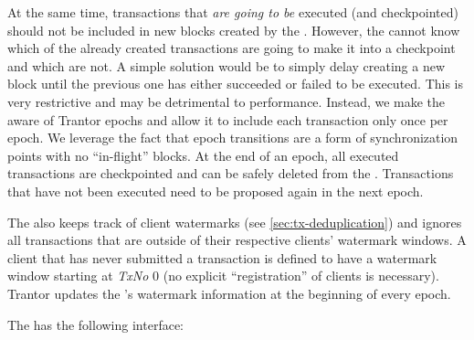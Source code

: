 \documentclass{article}
\begin{document}
At the same time, transactions that \emph{are going to be} executed (and checkpointed) should not be included in new blocks created by the .
However, the  cannot know which of the already created transactions are going to make it into a checkpoint and which are not.
A simple solution would be to simply delay creating a new block until the previous one has either succeeded or failed to be executed.
This is very restrictive and may be detrimental to performance.
Instead, we make the  aware of Trantor epochs and allow it to include each transaction only once per epoch.
We leverage the fact that epoch transitions are a form of synchronization points with no ``in-flight'' blocks.
At the end of an epoch, all executed transactions are checkpointed and can be safely deleted from the .
Transactions that have not been executed need to be proposed again in the next epoch.

The  also keeps track of client watermarks (see \cref{sec:tx-deduplication})
and ignores all transactions that are outside of their respective clients' watermark windows.
A client that has never submitted a transaction is defined to have a watermark window starting at \textit{TxNo} 0
(no explicit ``registration'' of clients is necessary).
Trantor updates the 's watermark information at the beginning of every epoch.

The  has the following interface:
\end{document}
